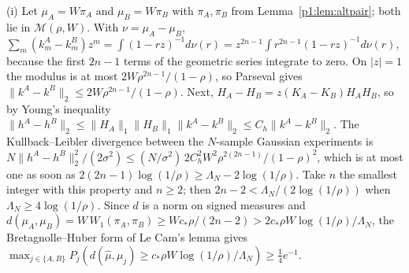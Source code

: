 (i) Let $\mu_A=W\pi_A$ and $\mu_B=W\pi_B$ with $\pi_A,\pi_B$ from Lemma~\ref{p1:lem:altpair}; both lie in $\mathcal M(\rho,W)$. With $\nu=\mu_A-\mu_B$, $\sum_m(k^A_m-k^B_m)z^m=\int(1-rz)^{-1}d\nu(r)=z^{2n-1}\int r^{2n-1}(1-rz)^{-1}d\nu(r)$, because the first $2n-1$ terms of the geometric series integrate to zero. On $|z|=1$ the modulus is at most $2W\rho^{2n-1}/(1-\rho)$, so Parseval gives $\|k^A-k^B\|_2\le2W\rho^{2n-1}/(1-\rho)$. Next, $H_A-H_B=z(K_A-K_B)H_AH_B$, so by Young's inequality $\|h^A-h^B\|_2\le\|H_A\|_1\|H_B\|_1\|k^A-k^B\|_2\le C_h\|k^A-k^B\|_2$. The Kullback--Leibler divergence between the $N$-sample Gaussian experiments is $N\|h^A-h^B\|_2^2/(2\sigma^2)\le(N/\sigma^2)\,2C_h^2W^2\rho^{2(2n-1)}/(1-\rho)^2$, which is at most one as soon as $2(2n-1)\log(1/\rho)\ge\Lambda_N-2\log(1/\rho)$. Take $n$ the smallest integer with this property and $n\ge2$; then $2n-2<\Lambda_N/(2\log(1/\rho))$ when $\Lambda_N\ge4\log(1/\rho)$. Since $d$ is a norm on signed measures and $d(\mu_A,\mu_B)=W\,W_1(\pi_A,\pi_B)\ge Wc_*\rho/(2n-2)>2c_*\rho W\log(1/\rho)/\Lambda_N$, the Bretagnolle--Huber form of Le Cam's lemma \citep[Lemma 2.6 and Theorem 2.2]{p1:tsybakov2009} gives $\max_{j\in\{A,B\}}P_j(d(\hat\mu,\mu_j)\ge c_*\rho W\log(1/\rho)/\Lambda_N)\ge\tfrac14e^{-1}$.

